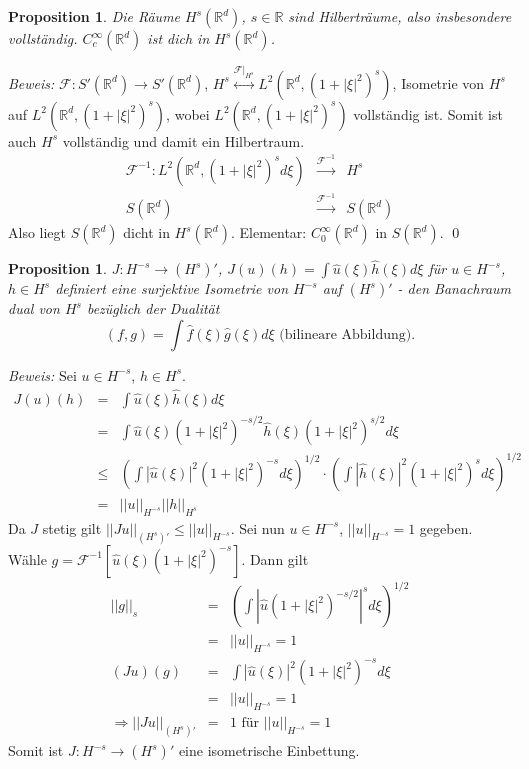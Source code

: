 \documentclass[12pt]{extreport} %
\newtheorem{Prop}[Satz]{Proposition}
\numberwithin{equation}{section}
\newcommand{\R}{\mathbb{R}} %
\newcommand{\f}{\hat{f}}
\newcommand{\g}{\hat{g}}
\newcommand{\F}{\mathcal{F}}
\newcommand{\m}{\cdot}
\newcommand{\Bew}{\emph{Beweis: }}
\begin{document}
	\begin{Prop}
		Die Räume $H^s(\R^d)$, $s\in \R$ sind Hilberträume, also insbesondere vollständig. $C_c^\infty(\R^d)$ ist dich in $H^s(\R^d)$.
	\end{Prop}
	
	\Bew $\F:S'(\R^d)\rightarrow S'(\R^d)$, $H^s\overset{\F|_{H^s}}{\leftrightarrow} L^2(\R^d, (1+|\xi|^2)^s)$, Isometrie von $H^s$ auf $L^2(\R^d, (1+|\xi|^2)^s)$, wobei $L^2(\R^d, (1+|\xi|^2)^s)$ vollständig ist. Somit ist auch $H^s$ vollständig und damit ein Hilbertraum.
	\begin{eqnarray}
		\F^{-1}: L^2(\R^d,(1+|\xi|^2)^s d\xi) &\overset{\F^{-1}}{\rightarrow}& H^s\nonumber\\
		S(\R^d)&\overset{\F^{-1}}{\rightarrow}& S(\R^d)\nonumber
	\end{eqnarray}
	Also liegt $S(\R^d)$ dicht in $H^s(\R^d)$. Elementar: $C_0^\infty(\R^d)$ in $S(\R^d)$.
	\qed
	
	\begin{Prop}
		$J:H^{-s}\rightarrow (H^s)'$, $J(u)(h) = \int \hat u(\xi) \hat h(\xi)d\xi$ für $u\in H^{-s}$, $h\in H^s$ definiert eine surjektive Isometrie von $H^{-s}$ auf $(H^s)'$ - den Banachraum dual von $H^s$ bezüglich der Dualität 
		$$(f,g) = \int \f(\xi)\g(\xi)d\xi \text{ (bilineare Abbildung)}.$$
	\end{Prop}
	
	\Bew Sei $u\in H^{-s}$, $h\in H^s$. 
	\begin{eqnarray}
		J(u)(h) &=& \int\hat u(\xi)\hat h(\xi)d\xi\nonumber\\
		&=& \int\hat u(\xi) (1+|\xi|^2)^{-s/2}\hat h(\xi)(1+|\xi|^2)^{s/2}d\xi\nonumber\\
		&\leq& \left(\int |\hat u(\xi)|^2 (1+|\xi|^2)^{-s} d\xi \right)^{1/2}\m \left(\int |\hat h(\xi)|^2 (1+|\xi|^2)^{s} d\xi \right)^{1/2}\nonumber\\
		&=& ||u||_{H^{-s}} ||h||_{H^s} \nonumber
	\end{eqnarray}
	Da $J$ stetig gilt $||J u||_{(H^s)'}\leq ||u||_{H^{-s}}$. Sei nun $u\in H^{-s}$, $||u||_{H^{-s}}= 1$ gegeben. Wähle $g = \F^{-1}[\hat u(\xi)(1+|\xi|^2)^{-s}]$. Dann gilt
	\begin{eqnarray}
		||g||_s &=& \left(\int|\hat u(1+|\xi|^2)^{-s/2}|^s d\xi \right)^{1/2}\nonumber\\
		&=& ||u||_{H^{-s}} = 1\nonumber\\
		(Ju)(g) &=& \int |\hat u(\xi)|^2(1+|\xi|^2)^{-s}d\xi\nonumber\\
		&=& ||u||_{H^{-s}} = 1\nonumber\\
		\Rightarrow ||Ju||_{(H^s)'} &=& 1\text{ für } ||u||_{H^{-s}} = 1\nonumber
	\end{eqnarray}
	Somit ist $J:H^{-s}\rightarrow (H^s)'$ eine isometrische Einbettung. 
	
\end{document}

